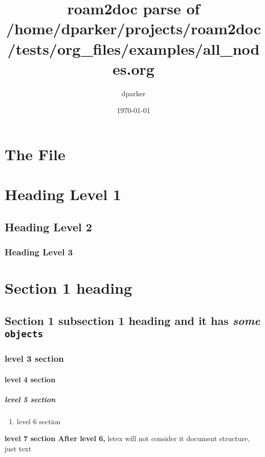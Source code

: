 \documentclass[11pt]{article}
\author{dparker}
\date{\today}
\title{roam2doc parse of /home/dparker/projects/roam2doc/tests/org\_files/examples/all\_nodes.org}
\begin{document}
\maketitle
\tableofcontents
\clearpage
\section{The File  }
 \label{obj-3}
 \label{obj-2}
\section{Heading Level 1  }
 \label{obj-6}
 \label{obj-5}
\subsection{Heading Level 2  }
 \label{obj-9}
 \label{obj-8}
\subsubsection{Heading Level 3  }
 \label{obj-12}
 \label{obj-11}
\section{Section 1 heading  }
 \label{obj-15}
 \label{obj-14}
\subsection{Section 1 subsection 1 heading and it has \textbf{\emph{some}} \texttt{objects}  }
 \label{obj-18}
 \label{obj-17}
\subsubsection{level 3 section  }
 \label{obj-24}
 \label{obj-23}
\paragraph{level 4 section  }
 \label{obj-27}
 \label{obj-26}
\subparagraph{level 5 section  }
 \label{obj-30}
 \label{obj-29}
\begin{enumerate}
\item level 6 section 
 \label{obj-33}
 \label{obj-32}
\end{enumerate}
\textbf{level 7 section After level 6,}\newline
letex will not consider it document structure, just text
\vspace{\baselineskip}
\end{document}
